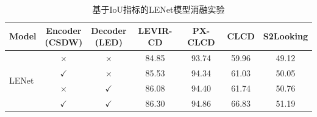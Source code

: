 \begin{table}[!htb]
  \centering
  \caption{基于IoU指标的LENet模型消融实验}
  \label{tab:lenet_ablation}
  \begin{tabular}{lcccccc}
    \toprule
    Model & \makecell{Encoder\\(CSDW)} & \makecell{Decoder\\(LED)} & LEVIR-CD & PX-CLCD & CLCD  & S2Looking \\
    \midrule
    \multirow{4}{*}{LENet} 
                        & $\times$      & $\times$      & 84.85    & 93.74   & 59.96 & 49.12     \\
                        & $\checkmark$  & $\times$      & 85.53    & 94.34   & 61.03 & 50.05     \\
                        & $\times$      & $\checkmark$  & 86.08    & 94.40   & 61.74 & 50.76     \\
                        & $\checkmark$  & $\checkmark$  & 86.30    & 94.86   & 66.83 & 51.19     \\
    \bottomrule
  \end{tabular}
\end{table}




